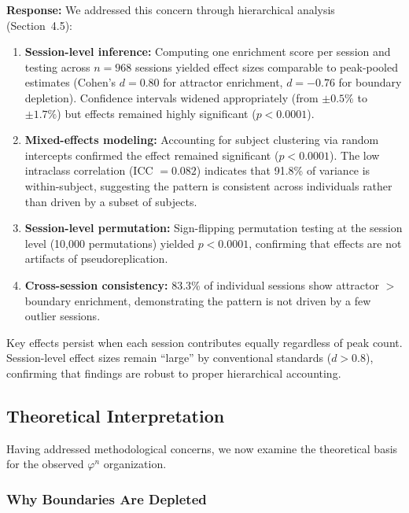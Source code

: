 \documentclass[11pt,a4paper]{article}
\newcommand{\phisym}{\varphi}
\begin{document}
\textbf{Response:} We addressed this concern through hierarchical analysis (Section~4.5):

\begin{enumerate}
    \item \textbf{Session-level inference:} Computing one enrichment score per session and testing across $n = 968$ sessions yielded effect sizes comparable to peak-pooled estimates (Cohen's $d = 0.80$ for attractor enrichment, $d = -0.76$ for boundary depletion). Confidence intervals widened appropriately (from $\pm 0.5\%$ to $\pm 1.7\%$) but effects remained highly significant ($p < 0.0001$).

    \item \textbf{Mixed-effects modeling:} Accounting for subject clustering via random intercepts confirmed the effect remained significant ($p < 0.0001$). The low intraclass correlation (ICC $= 0.082$) indicates that 91.8\% of variance is within-subject, suggesting the pattern is consistent across individuals rather than driven by a subset of subjects.

    \item \textbf{Session-level permutation:} Sign-flipping permutation testing at the session level (10,000 permutations) yielded $p < 0.0001$, confirming that effects are not artifacts of pseudoreplication.

    \item \textbf{Cross-session consistency:} 83.3\% of individual sessions show attractor $>$ boundary enrichment, demonstrating the pattern is not driven by a few outlier sessions.
\end{enumerate}

Key effects persist when each session contributes equally regardless of peak count. Session-level effect sizes remain ``large'' by conventional standards ($d > 0.8$), confirming that findings are robust to proper hierarchical accounting.

\subsection{Theoretical Interpretation}
\label{sec:theoretical_interpretation}

Having addressed methodological concerns, we now examine the theoretical basis for the observed $\phisym^n$ organization.

\subsubsection{Why Boundaries Are Depleted}
\end{document}

